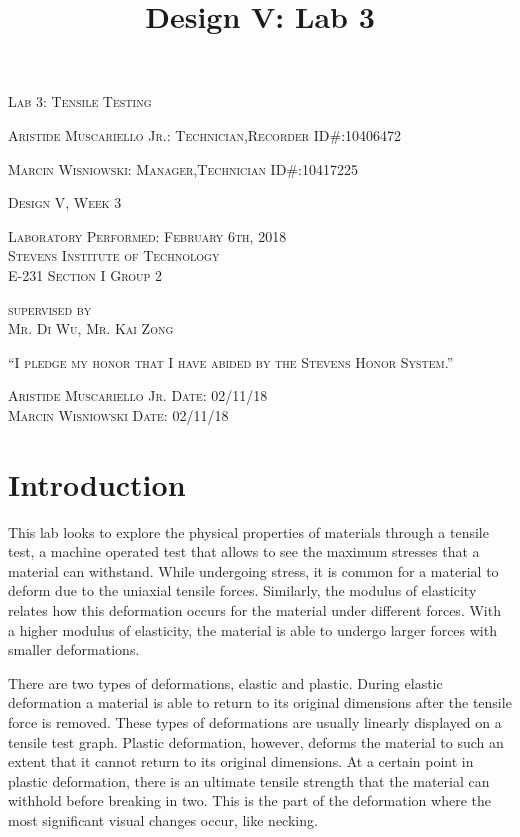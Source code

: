 \documentclass{article}
\begin{document}
\title{Design V: Lab 3}
\begin{titlepage}
    \centering
	{\scshape\LARGE Lab 3: Tensile Testing\par}
	\vspace{1cm}
	{\scshape Aristide Muscariello Jr.: Technician,Recorder \hfill ID\#:10406472 \par}
	{\scshape Marcin Wisniowski: Manager,Technician \hfill ID\#:10417225\par}
	\vfill
	{\scshape Design V, Week 3\par}
	\vspace{.5cm}
	{\scshape Laboratory Performed: February 6th, 2018\\Stevens Institute of Technology\\E-231 Section I Group 2\par}
	\vspace{.5cm}
	{\scshape supervised by\\Mr. Di Wu, Mr. Kai Zong \par}
    \vfill
	{\scshape“I pledge my honor that I have abided by the Stevens Honor System.”\par}
	\vspace{.5cm}
	{\scshape Aristide Muscariello Jr. \hfill Date: 02/11/18\\Marcin Wisniowski \hfill Date: 02/11/18\\}
	\vspace{3cm}
\end{titlepage}

\section{Introduction}
This lab looks to explore the physical properties of materials through a tensile test, a machine operated test that allows to see the maximum stresses that a material can withstand. While undergoing stress, it is common for a material to deform due to the uniaxial tensile forces. Similarly, the modulus of elasticity relates how this deformation occurs for the material under different forces. With a higher modulus of elasticity, the material is able to undergo larger forces with smaller deformations.
	
There are two types of deformations, elastic and plastic. During elastic deformation a material is able to return to its original dimensions after the tensile force is removed. These types of deformations are usually linearly displayed on a tensile test graph. Plastic deformation, however, deforms the material to such an extent that it cannot return to its original dimensions. At a certain point in plastic deformation, there is an ultimate tensile strength that the material can withhold before breaking in two. This is the part of the deformation where the most significant visual changes occur, like necking. 
\end{document}
